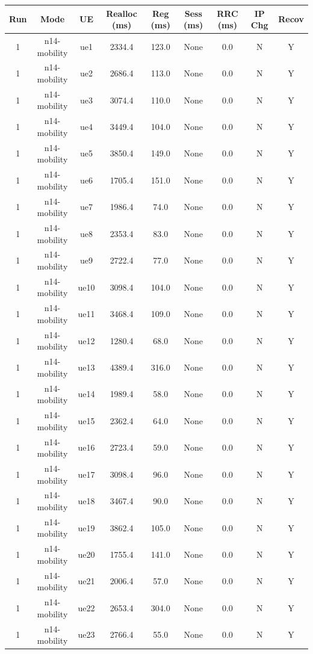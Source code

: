 \begin{table}[ht]
\centering
\begin{tabular}{|c|c|c|c|c|c|c|c|c|}
\hline
Run & Mode & UE & Realloc (ms) & Reg (ms) & Sess (ms) & RRC (ms) & IP Chg & Recov \\
\hline
1 & n14-mobility & ue1 & 2334.4 & 123.0 & None & 0.0 & N & Y \\
1 & n14-mobility & ue2 & 2686.4 & 113.0 & None & 0.0 & N & Y \\
1 & n14-mobility & ue3 & 3074.4 & 110.0 & None & 0.0 & N & Y \\
1 & n14-mobility & ue4 & 3449.4 & 104.0 & None & 0.0 & N & Y \\
1 & n14-mobility & ue5 & 3850.4 & 149.0 & None & 0.0 & N & Y \\
1 & n14-mobility & ue6 & 1705.4 & 151.0 & None & 0.0 & N & Y \\
1 & n14-mobility & ue7 & 1986.4 & 74.0 & None & 0.0 & N & Y \\
1 & n14-mobility & ue8 & 2353.4 & 83.0 & None & 0.0 & N & Y \\
1 & n14-mobility & ue9 & 2722.4 & 77.0 & None & 0.0 & N & Y \\
1 & n14-mobility & ue10 & 3098.4 & 104.0 & None & 0.0 & N & Y \\
1 & n14-mobility & ue11 & 3468.4 & 109.0 & None & 0.0 & N & Y \\
1 & n14-mobility & ue12 & 1280.4 & 68.0 & None & 0.0 & N & Y \\
1 & n14-mobility & ue13 & 4389.4 & 316.0 & None & 0.0 & N & Y \\
1 & n14-mobility & ue14 & 1989.4 & 58.0 & None & 0.0 & N & Y \\
1 & n14-mobility & ue15 & 2362.4 & 64.0 & None & 0.0 & N & Y \\
1 & n14-mobility & ue16 & 2723.4 & 59.0 & None & 0.0 & N & Y \\
1 & n14-mobility & ue17 & 3098.4 & 96.0 & None & 0.0 & N & Y \\
1 & n14-mobility & ue18 & 3467.4 & 90.0 & None & 0.0 & N & Y \\
1 & n14-mobility & ue19 & 3862.4 & 105.0 & None & 0.0 & N & Y \\
1 & n14-mobility & ue20 & 1755.4 & 141.0 & None & 0.0 & N & Y \\
1 & n14-mobility & ue21 & 2006.4 & 57.0 & None & 0.0 & N & Y \\
1 & n14-mobility & ue22 & 2653.4 & 304.0 & None & 0.0 & N & Y \\
1 & n14-mobility & ue23 & 2766.4 & 55.0 & None & 0.0 & N & Y \\

\end{tabular}
\end{table}

